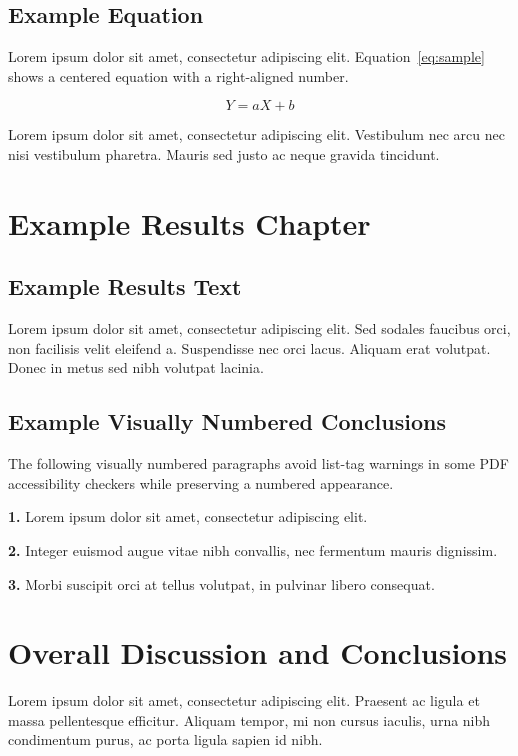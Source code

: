 \documentclass[doctoral,fulldocument,secnum,pdfonly,boundcover]{uofm}
\begin{document}
\section{Example Equation}

Lorem ipsum dolor sit amet, consectetur adipiscing elit. Equation~\ref{eq:sample}
shows a centered equation with a right-aligned number.

\begin{equation}
Y = aX + b
\label{eq:sample}
\end{equation}

Lorem ipsum dolor sit amet, consectetur adipiscing elit. Vestibulum nec arcu nec
nisi vestibulum pharetra. Mauris sed justo ac neque gravida tincidunt.

\chapter{Example Results Chapter}

\section{Example Results Text}

Lorem ipsum dolor sit amet, consectetur adipiscing elit. Sed sodales faucibus
orci, non facilisis velit eleifend a. Suspendisse nec orci lacus. Aliquam erat
volutpat. Donec in metus sed nibh volutpat lacinia.

\section{Example Visually Numbered Conclusions}

The following visually numbered paragraphs avoid list-tag warnings in some PDF
accessibility checkers while preserving a numbered appearance.

\noindent\textbf{1.} Lorem ipsum dolor sit amet, consectetur adipiscing elit.

\noindent\textbf{2.} Integer euismod augue vitae nibh convallis, nec fermentum
mauris dignissim.

\noindent\textbf{3.} Morbi suscipit orci at tellus volutpat, in pulvinar libero
consequat.

\chapter{Overall Discussion and Conclusions}

Lorem ipsum dolor sit amet, consectetur adipiscing elit. Praesent ac ligula et
massa pellentesque efficitur. Aliquam tempor, mi non cursus iaculis, urna nibh
condimentum purus, ac porta ligula sapien id nibh.
\end{document}
